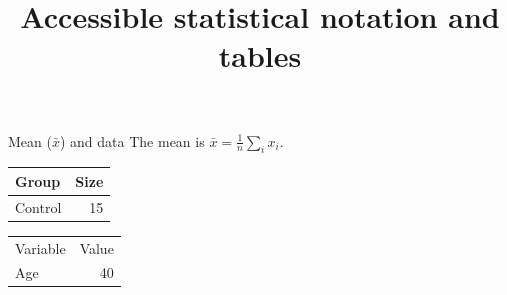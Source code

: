 \documentclass[14pt,t]{beamer}
\title{Accessible statistical notation and tables}
\begin{document}
\begin{frame}{Mean ($\bar{x}$) and data}
The mean is $\bar{x}=\frac{1}{n}\sum_i x_i$.
\begin{table}
\begin{tabular}{lr}
\toprule
Group & Size  \\
\midrule
Control & 15  \\
\bottomrule
\end{tabular}
\end{table}
\begin{table}
\begin{tabular}{lr}
Variable & Value  \\
Age & 40  \\
\end{tabular}
\end{table}
\end{frame}
\end{document}
